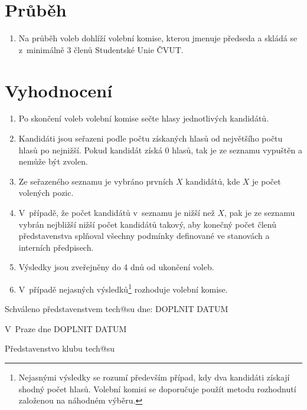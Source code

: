 \documentclass[10pt]{article}
\def \Datum {DOPLNIT DATUM} %
\begin{document}
\section{Průběh}
	\begin{enumerate}
		\item Na průběh voleb dohlíží volební komise, kterou jmenuje předseda a skládá se z~minimálně 3 členů Studentské Unie ČVUT.
	\end{enumerate}

\section{Vyhodnocení}
	\begin{enumerate}
		\item Po skončení voleb volební komise sečte hlasy jednotlivých kandidátů.
		\item Kandidáti jsou seřazeni podle počtu získaných hlasů od největšího počtu hlasů po nejnižší. Pokud kandidát získá 0 hlasů, tak je ze seznamu vypuštěn a nemůže být zvolen.
		\item Ze seřazeného seznamu je vybráno prvních $X$ kandidátů, kde $X$ je počet volených pozic.
		\item V~případě, že počet kandidátů v~seznamu je nižší než $X$, pak je ze seznamu vybrán nejbližší nižší počet kandidátů takový, aby konečný počet členů představenstva splňoval všechny podmínky definované ve stanovách a interních předpisech.
		\item Výsledky jsou zveřejněny do 4 dnů od ukončení voleb.
		\item V~případě nejasných výsledků\footnote{Nejasnými výsledky se rozumí především případ, kdy dva kandidáti získají shodný počet hlasů. Volební komisi se doporučuje použít metodu rozhodnutí založenou na náhodném výběru.} rozhoduje volební komise.
	\end{enumerate}

\vspace{10mm}

Schváleno představenstvem tech@su dne: \Datum

\vspace{30mm}

\hfill V~Praze dne \Datum

\hfill Představenstvo klubu tech@su
\end{document}
